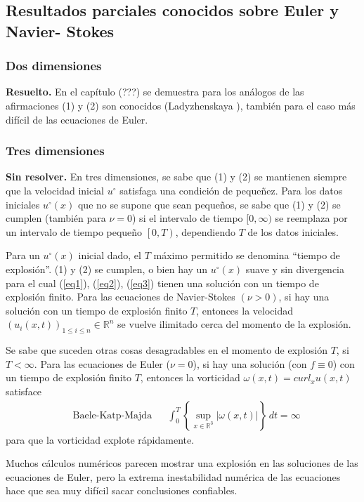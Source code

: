 \subsection{Resultados parciales conocidos sobre Euler y Navier- Stokes}
\subsubsection{Dos dimensiones}
\textbf{Resuelto.} En el capítulo (???) se demuestra para los análogos de las afirmaciones (1) y (2) son conocidos (Ladyzhenskaya \cite{ladyzhenskaya1969mathematical}), también para el caso más difícil de las ecuaciones de Euler. 
\subsubsection{Tres dimensiones}
\textbf{Sin resolver.} En tres dimensiones, se sabe que (1) y (2) se mantienen siempre que la velocidad inicial $u^{\circ}$ satisfaga una condición de pequeñez. Para los datos iniciales $u^{\circ}(x)$ que no se supone que sean pequeños, se sabe que (1) y (2) se cumplen (también para $\nu=0$) si el intervalo de tiempo $[0,\infty)$ se reemplaza por un intervalo de tiempo pequeño $\left[0, T\right)$, dependiendo $T$ de los datos iniciales.

Para un $u^{\circ}(x)$ inicial dado, el $T$ máximo permitido se denomina ``tiempo de explosión''. (1) y (2) se cumplen, o bien hay un $u^{\circ}(x)$ suave y sin divergencia para el cual (\ref{eq1}), (\ref{eq2}), (\ref{eq3}) tienen una solución con un tiempo de explosión finito. Para las ecuaciones de Navier-Stokes $(\nu > 0)$, si hay una solución con un tiempo de explosión finito $T$, entonces la velocidad $\left(u_i(x,t)\right)_{1\leq i \leq n}\in \mathbb{R}^n$ se vuelve ilimitado cerca del momento de la explosión.

Se sabe que suceden otras cosas desagradables en el momento de explosión $T$, si $T < \infty$. Para las ecuaciones de Euler ($\nu = 0$), si hay una solución (con $f \equiv  0$) con un tiempo de explosión finito $T$, entonces la vorticidad $\omega(x, t) = curl_x u(x, t)$ satisface
\begin{align}
    &\text{Baele-Katp-Majda}&&\int_0^T \left\{ \sup_{x\in \mathbb{R}^3}\left\lvert \omega(x,t)\right\rvert\right\}\, dt = \infty
\end{align}
para que la vorticidad explote rápidamente.

Muchos cálculos numéricos parecen mostrar una explosión en las soluciones de las ecuaciones de Euler, pero la extrema inestabilidad numérica de las ecuaciones hace que sea muy difícil sacar conclusiones confiables.


